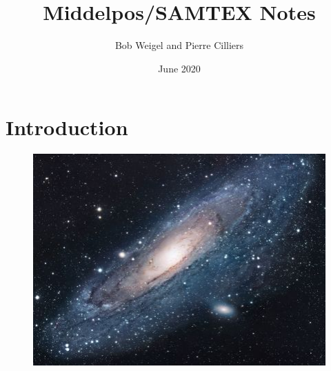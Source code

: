 \documentclass{article}
\title{Middelpos/SAMTEX Notes}
\author{Bob Weigel and Pierre Cilliers}
\date{June 2020}
\begin{document}
\maketitle

\section{Introduction}

\begin{figure}[h!]
\centering
\includegraphics[width=\textwidth]{figures/universe}
\caption{}
\label{fig:universe}
\end{figure}

\end{document}
